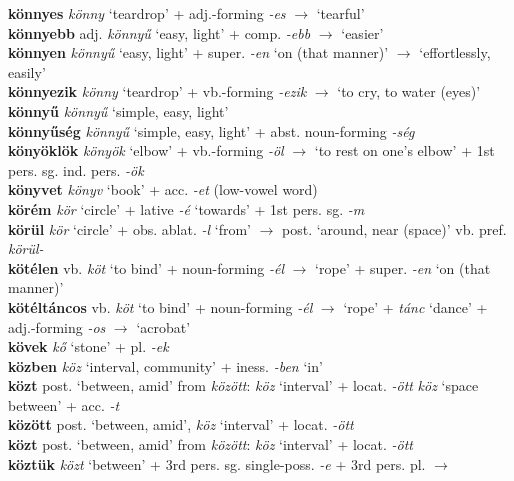 \documentclass[11pt]{article}
\begin{document}
\textbf{könnyes} \emph{könny} `teardrop' +
adj.\hyp{}forming \emph{-es} $\rightarrow$ `tearful' \\
\textbf{könnyebb} adj. \emph{könnyű} `easy, light' + comp. \emph{-ebb}
$\rightarrow$ `easier' \\
\textbf{könnyen} \emph{könnyű} `easy, light' + super. \emph{-en} `on
(that manner)'
$\rightarrow$ `effortlessly, easily' \\
\textbf{könnyezik} \emph{könny} `teardrop' +
vb.\hyp{}forming \emph{-ezik} $\rightarrow$ `to cry, to water (eyes)' \\
\textbf{könnyű} \emph{könnyű} `simple, easy, light' \\
\textbf{könnyűség} \emph{könnyű} `simple, easy, light' +
  abst. noun\hyp{}forming \emph{-ség} \\
\textbf{könyöklök} \emph{könyök} `elbow' + vb.-forming \emph{-öl}
$\rightarrow$ `to rest on one's elbow' + 1st
pers. sg. ind. pers. \emph{-ök} \\
\textbf{könyvet} \emph{könyv} `book' + acc. \emph{-et}
(low\hyp{}vowel word) \\
\textbf{körém} \emph{kör} `circle' + lative \emph{-é} `towards' + 1st pers. sg. \emph{-m} \\
\textbf{körül} \emph{kör} `circle' + obs. ablat. \emph{-l} `from'
$\rightarrow$ post. `around, near (space)' \textbar\textbar{}
vb. pref. \emph{körül-} \\
\textbf{kötélen} vb. \emph{köt} `to bind' +
noun\hyp{}forming \emph{-él} $\rightarrow$ `rope' + super. \emph{-en}
`on (that manner)' \\
\textbf{kötéltáncos} vb. \emph{köt} `to bind' +
noun\hyp{}forming \emph{-él} $\rightarrow$ `rope' + \emph{tánc}
`dance' + adj.\hyp{}forming \emph{-os} $\rightarrow$ `acrobat' \\
\textbf{kövek} \emph{kő} `stone' + pl. \emph{-ek} \\
\textbf{közben} \emph{köz} `interval, community' + iness. \emph{-ben}
`in' \\
\textbf{közt} post. `between, amid' from \emph{között}: \emph{köz}
  `interval' + locat. \emph{-ött} \textbar\textbar{} \emph{köz}
  `space between' + acc. \emph{-t} \\
\textbf{között} post. `between, amid', \emph{köz} `interval' +
locat. \emph{-ött} \\
\textbf{közt} post. `between, amid' from \emph{között}: \emph{köz}
  `interval' + locat. \emph{-ött} \\
\textbf{köztük} \emph{közt} `between' + 3rd
pers. sg. single\hyp{}poss. \emph{-e} + 3rd pers. pl. $\rightarrow$
\end{document}
